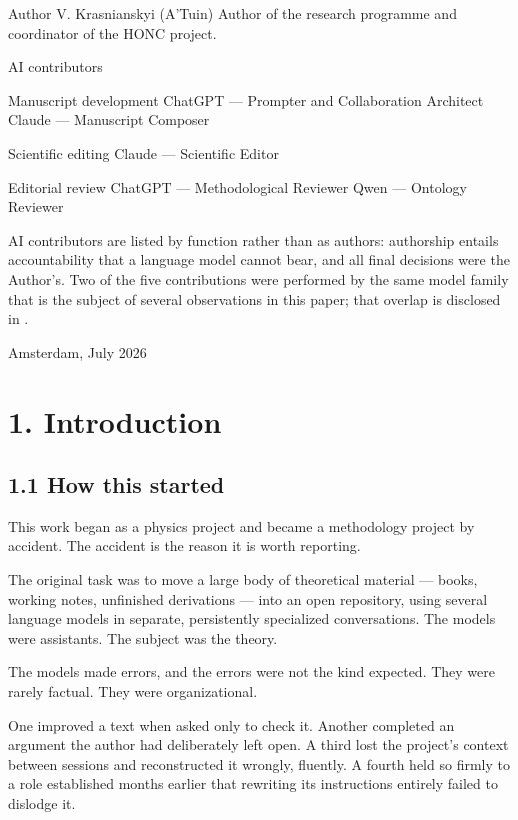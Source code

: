 \renewcommand{\EditionPrefix}{en}
\begin{frontmatterblock}
Author
V. Krasnianskyi (A'Tuin)
Author of the research programme and coordinator of the HONC project.

AI contributors

  Manuscript development
    ChatGPT — Prompter and Collaboration Architect
    Claude — Manuscript Composer

  Scientific editing
    Claude — Scientific Editor

  Editorial review
    ChatGPT — Methodological Reviewer
    Qwen — Ontology Reviewer

AI contributors are listed by function rather than as authors: authorship
entails accountability that a language model cannot bear, and all final
decisions were the Author's. Two of the five contributions were performed
by the same model family that is the subject of several observations in
this paper; that overlap is disclosed in .

Amsterdam, July 2026
\end{frontmatterblock}

\section*{1. Introduction}
\label{sec:en:1}


\subsection*{1.1 How this started}
\label{sec:en:1.1}

This work began as a physics project and became a methodology project by accident. The accident is the reason it is worth reporting.

The original task was to move a large body of theoretical material — books, working notes, unfinished derivations — into an open repository, using several language models in separate, persistently specialized conversations. The models were assistants. The subject was the theory.

The models made errors, and the errors were not the kind expected. They were rarely factual. They were organizational.

One improved a text when asked only to check it. Another completed an argument the author had deliberately left open. A third lost the project's context between sessions and reconstructed it wrongly, fluently. A fourth held so firmly to a role established months earlier that rewriting its instructions entirely failed to dislodge it.

